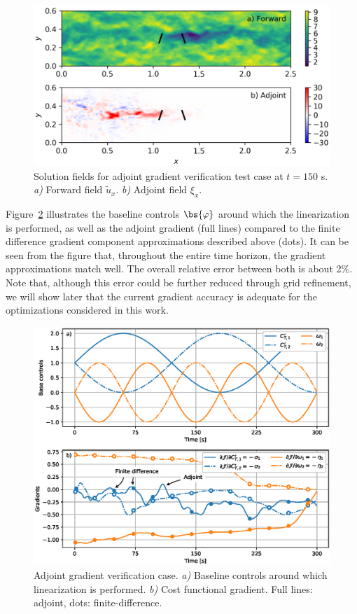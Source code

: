 	\begin{figure}[t]
		\includegraphics[width=\textwidth]{chapters/optimal_control_problem/forward_v_adjoint.eps}
	\caption{Solution fields for adjoint gradient verification test case at $t=150$ s. \emph{a)} Forward field $\tilde{u}_x$. \emph{b)} Adjoint field $\xi_x$. \label{fig:forwardfield_adjointfield}}
	\end{figure}

	Figure~\ref{fig:gradient_verification} illustrates the baseline controls $\bs{\varphi}$ around which the linearization is performed, as well as the adjoint gradient (full lines) compared to the finite difference gradient component approximations described above (dots). It can be seen from the figure that, throughout the entire time horizon, the gradient approximations match well. The overall relative error between both is about 2$\%$. Note that, although this error could be further reduced through grid refinement, we will show later that the current gradient accuracy is adequate for the optimizations considered in this work.
	
	\begin{figure}[b]
		\includegraphics[width=\textwidth]{chapters/optimal_control_problem/gradient_verification.eps}
		\caption{Adjoint gradient verification case. \emph{a)} Baseline controls around which linearization is performed. \emph{b)} Cost functional gradient. Full lines: adjoint, dots: finite-difference. \label{fig:gradient_verification}}
	\end{figure}

